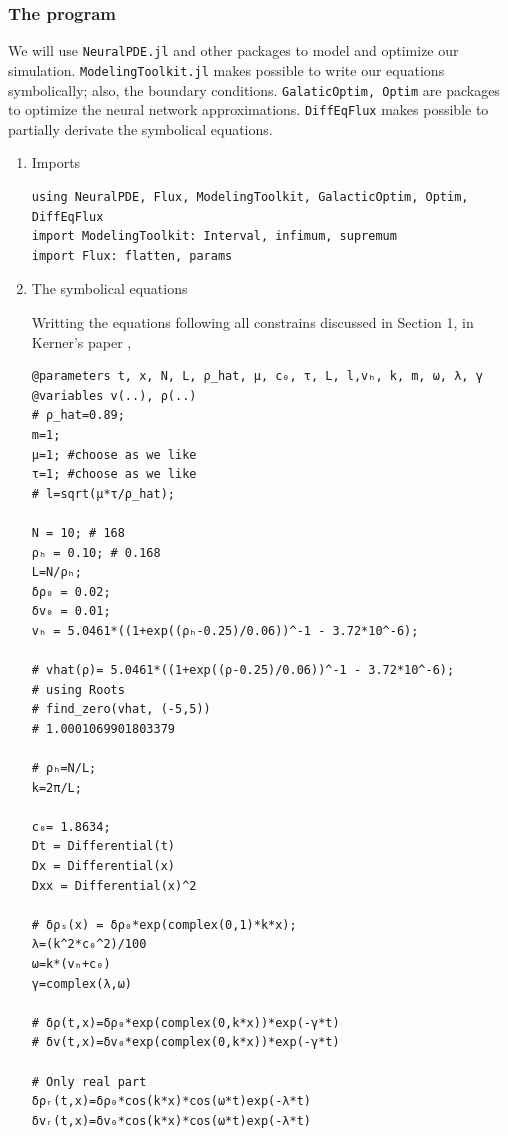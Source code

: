 \documentclass[11pt]{article}
\begin{document}
\subsubsection{The program}
\label{sec:orgfbca5f7}

We will use \texttt{NeuralPDE.jl} and other packages to model and optimize our
simulation. \texttt{ModelingToolkit.jl} makes possible to write our equations
symbolically; also, the boundary conditions. \texttt{GalaticOptim, Optim} are packages
to optimize the neural network approximations. \texttt{DiffEqFlux} makes possible to
partially derivate the symbolical equations.

\begin{enumerate}
\item Imports
\label{sec:org74f7285}
\begin{verbatim}
using NeuralPDE, Flux, ModelingToolkit, GalacticOptim, Optim, DiffEqFlux
import ModelingToolkit: Interval, infimum, supremum
import Flux: flatten, params
\end{verbatim}

\item The symbolical equations
\label{sec:org58b0347}

Writting the equations following all constrains discussed in Section 1, in
Kerner's paper \cite{kerner1993},

\begin{verbatim}
@parameters t, x, N, L, ρ_hat, μ, c₀, τ, L, l,vₕ, k, m, ω, λ, γ
@variables v(..), ρ(..)
# ρ_hat=0.89;
m=1;
μ=1; #choose as we like
τ=1; #choose as we like
# l=sqrt(μ*τ/ρ_hat);

N = 10; # 168
ρₕ = 0.10; # 0.168
L=N/ρₕ;
δρ₀ = 0.02;
δv₀ = 0.01;
vₕ = 5.0461*((1+exp((ρₕ-0.25)/0.06))^-1 - 3.72*10^-6);

# vhat(ρ)= 5.0461*((1+exp((ρ-0.25)/0.06))^-1 - 3.72*10^-6);
# using Roots
# find_zero(vhat, (-5,5))
# 1.0001069901803379

# ρₕ=N/L;
k=2π/L;

c₀= 1.8634;
Dt = Differential(t)
Dx = Differential(x)
Dxx = Differential(x)^2

# δρₛ(x) = δρ₀*exp(complex(0,1)*k*x);
λ=(k^2*c₀^2)/100
ω=k*(vₕ+c₀)
γ=complex(λ,ω)

# δρ(t,x)=δρ₀*exp(complex(0,k*x))*exp(-γ*t)
# δv(t,x)=δv₀*exp(complex(0,k*x))*exp(-γ*t)

# Only real part
δρᵣ(t,x)=δρ₀*cos(k*x)*cos(ω*t)exp(-λ*t)
δvᵣ(t,x)=δv₀*cos(k*x)*cos(ω*t)exp(-λ*t)


\end{verbatim}
\end{enumerate}
\end{document}
